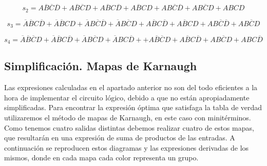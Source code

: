 \begin{equation}\label{s2_mini}
    s_{2} = A\overline{B}\overline{C}\overline{D} +A\overline{B}\overline{C}D+A\overline{B}C\overline{D}+A\overline{B}CD+AB\overline{C}\overline{D}+AB\overline{C}D+ABCD
\end{equation}

\begin{equation}\label{s3_mini}
    s_{3} = \overline{A}\overline{B}C\overline{D}+\overline{A}\overline{B}CD+\overline{A}B\overline{C}\overline{D}+\overline{A}B\overline{C}D+A\overline{B}C\overline{D}+A\overline{B}CD+AB\overline{C}\overline{D}+AB\overline{C}D
\end{equation}

\begin{equation}\label{s4_mini}
    s_{4} = \overline{A}\overline{B}\overline{C}D+\overline{A}\overline{B}C\overline{D}+\overline{A}B\overline{C}D+\overline{A}BC\overline{D}++A\overline{B}\overline{C}D+A\overline{B}C\overline{D}+AB\overline{C}D+ABC\overline{D}
\end{equation}

\subsection{Simplificaci\'on. Mapas de Karnaugh}

Las expresiones calculadas en el apartado anterior no son del todo eficientes a la hora de implementar el circuito l\'ogico, debido a que no est\'an apropiadamente simplificadas. Para encontrar la expresi\'on \'optima que satisfaga la tabla de verdad utilizaremos el m\'etodo de mapas de Karnaugh, en este caso con minit\'erminos. Como tenemos cuatro salidas distintas debemos realizar cuatro de estos mapas, que resultar\'an en una expresi\'on de suma de productos de las entradas. A continuaci\'on se reproducen estos diagramas y las expresiones derivadas de los mismos, donde en cada mapa cada color representa un grupo.

